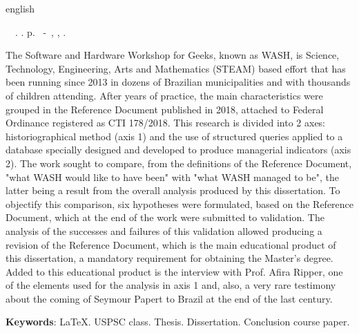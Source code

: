 \begin{resumo}[Abstract]
 \begin{otherlanguage*}{english}
	\begin{flushleft} 
		\setlength{\absparsep}{0pt} %
 		\SingleSpacing  		\imprimirautorabr~~\textbf{\imprimirtitleabstract}.	\imprimirdata.  \pageref{LastPage}p. 
		\imprimirtipotrabalhoabs~-~\imprimirinstituicao, \imprimirlocal, 	\imprimirdata. 
 	\end{flushleft}
	\OnehalfSpacing 
The Software and Hardware Workshop for Geeks, known as WASH, is Science, Technology, Engineering, Arts and Mathematics (STEAM) based effort that has been running since 2013 in dozens of Brazilian municipalities and with thousands of children attending. After years of practice, the main characteristics were grouped in the Reference Document published in 2018, attached to Federal Ordinance registered as CTI 178/2018. This research is divided into 2 axes: historiographical method (axis 1) and the use of structured queries applied to a database specially designed and developed to produce managerial indicators (axis 2). The work sought to compare, from the definitions of the Reference Document, "what WASH would like to have been" with "what WASH managed to be", the latter being a result from the overall analysis produced by this dissertation. To objectify this comparison, six hypotheses were formulated, based on the Reference Document, which at the end of the work were submitted to validation. The analysis of the successes and failures of this validation allowed producing a revision of the Reference Document, which is the main educational product of this dissertation, a mandatory requirement for obtaining the Master's degree. Added to this educational product is the interview with Prof. Afira Ripper, one of the elements used for the analysis in axis 1 and, also, a very rare testimony about the coming of Seymour Papert to Brazil at the end of the last century.


   \vspace{\onelineskip}
 
   \noindent 
   \textbf{Keywords}: LaTeX. USPSC class. Thesis. Dissertation. Conclusion course paper. 
 \end{otherlanguage*}
\end{resumo}
